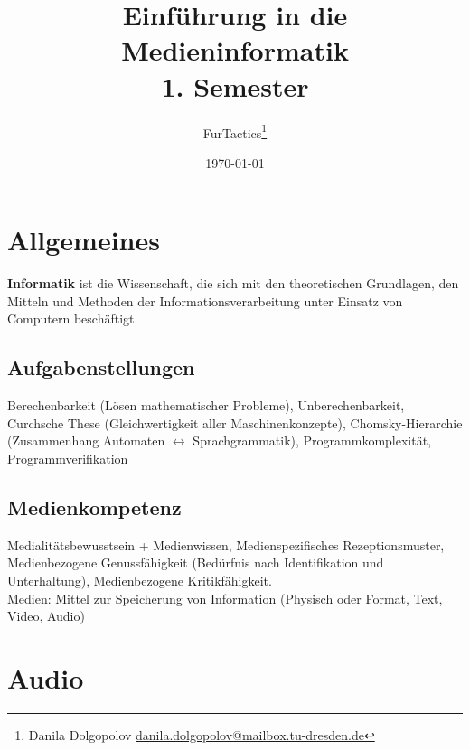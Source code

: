 \documentclass[12pt,landscape]{article}
\begin{document}
\footnotesize
\author{FurTactics\thanks {Danila Dolgopolov \href{mailto://danila.dolgopolov@mailbox.tu-dresden.de}{danila.dolgopolov@mailbox.tu-dresden.de}}}
\title{\Large Einführung in die Medieninformatik\\1. Semester}
\date{\normalsize \today}
\maketitle
\begin{multicols}{2}
    \renewcommand{\baselinestretch}{0.75}\normalsize
    \tableofcontents
\end{multicols}
\newpage
\begin{multicols}{3}

\section*{Allgemeines}
\textbf{Informatik} ist die Wissenschaft, die sich mit den theoretischen Grundlagen, den Mitteln und Methoden der Informationsverarbeitung unter Einsatz von Computern beschäftigt
\subsection*{Aufgabenstellungen}
Berechenbarkeit (Lösen mathematischer Probleme), Unberechenbarkeit, Curchsche
These (Gleichwertigkeit aller Maschinenkonzepte), Chomsky-Hierarchie (Zusammenhang Automaten $\leftrightarrow$ Sprachgrammatik), Programmkomplexität, Programmverifikation
\subsection*{Medienkompetenz}
Medialitätsbewusstsein + Medienwissen, Medienspezifisches Rezeptionsmuster, Medienbezogene Genussfähigkeit (Bedürfnis nach Identifikation und Unterhaltung), Medienbezogene Kritikfähigkeit.\\
Medien: Mittel zur Speicherung von Information (Physisch oder Format, Text, Video, Audio)
\section{Audio}

\end{multicols}
\end{document}
